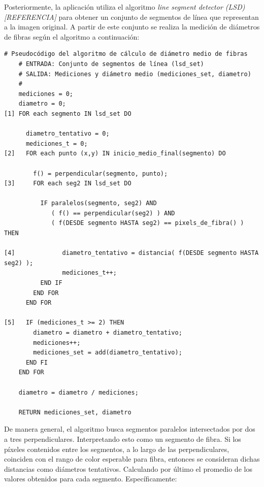 \documentclass[runningheads,a4paper]{llncs}
\begin{document}
Posteriormente, la aplicación utiliza el algoritmo {\it line segment detector (LSD) [REFERENCIA]} para obtener un conjunto de segmentos de línea que representan a la imagen original. A partir de este conjunto se 
realiza la medición de diámetros de fibras según el algoritmo a continuación:

\begin{Verbatim}[commandchars=\\\{\}]
    # Pseudocódigo del algoritmo de cálculo de diámetro medio de fibras
    # ENTRADA: Conjunto de segmentos de línea (lsd_set)
    # SALIDA: Mediciones y diámetro medio (mediciones_set, diametro)
    #
    mediciones = 0;
    diametro = 0;
[1] FOR each segmento IN lsd_set DO

      diametro_tentativo = 0;
      mediciones_t = 0;
[2]   FOR each punto (x,y) IN inicio_medio_final(segmento) DO

        f() = perpendicular(segmento, punto);
[3]     FOR each seg2 IN lsd_set DO

          IF paralelos(segmento, seg2) AND 
             ( f() == perpendicular(seg2) ) AND
             ( f(DESDE segmento HASTA seg2) == pixels_de_fibra() ) THEN

[4]             diametro_tentativo = distancia( f(DESDE segmento HASTA seg2) );
                mediciones_t++;
          END IF
        END FOR
      END FOR

[5]   IF (mediciones_t >= 2) THEN 
        diametro = diametro + diametro_tentativo;
        mediciones++;
        mediciones_set = add(diametro_tentativo);
      END FI
    END FOR

    diametro = diametro / mediciones;

    RETURN mediciones_set, diametro
\end{Verbatim}

 
De manera general, el algoritmo busca segmentos paralelos intersectados por dos a tres perpendiculares.
Interpretando esto como un segmento de fibra. Si los píxeles contenidos entre los segmentos, a lo largo de
 las  perpendiculares, coinciden con el rango de color esperable para fibra, entonces se consideran dichas
distancias como diámetros tentativos. Calculando por último el promedio de los valores obtenidos para 
cada segmento. Específicamente:   
\end{document}
